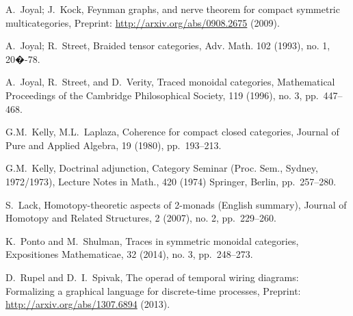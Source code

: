 \documentclass[11pt,oneside,article]{memoir}
\begin{document}
\begin{thebibliography}{XXX}
 A.~Joyal; J.~Kock, Feynman graphs, and nerve theorem for compact symmetric multicategories, Preprint: \url{http://arxiv.org/abs/0908.2675} (2009).

 A.~Joyal; R.~Street, Braided tensor categories, Adv. Math. 102 (1993), no. 1, 20�-78.

 A.~Joyal, R.~Street, and D.~Verity, Traced monoidal categories, Mathematical Proceedings of the Cambridge Philosophical Society, 119 (1996), no. 3, pp.~447--468.

 G.M.~Kelly, M.L.~Laplaza, Coherence for compact closed categories, Journal of Pure and Applied Algebra, 19 (1980), pp.~193--213.

 G.M.~Kelly, Doctrinal adjunction, Category Seminar (Proc. Sem., Sydney, 1972/1973), Lecture Notes in Math., 420 (1974) Springer, Berlin, pp.~257--280.



 S.~Lack, Homotopy-theoretic aspects of 2-monads (English summary), Journal of Homotopy and Related Structures, 2 (2007), no. 2, pp.~229--260.





 K.~Ponto and M.~Shulman, Traces in symmetric monoidal categories, Expositiones Mathematicae, 32 (2014), no. 3, pp.~248--273.

 D.~Rupel and D.~I.~Spivak, The operad of temporal wiring diagrams: Formalizing a graphical language for discrete-time processes, Preprint: \url{http://arxiv.org/abs/1307.6894} (2013).


\end{thebibliography}
\end{document}
